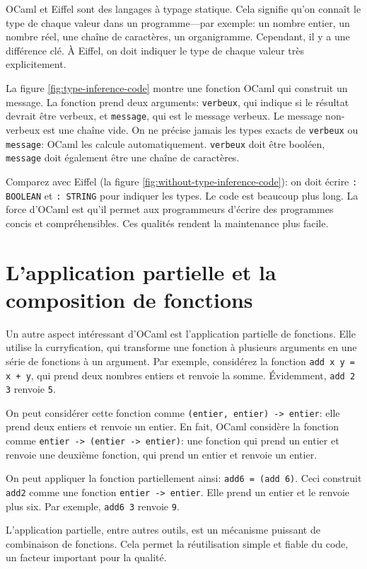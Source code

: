 \documentclass[french]{report}
\begin{document}
OCaml et Eiffel sont des langages à typage statique. Cela signifie qu'on connaît le type de chaque valeur dans un programme---par exemple: un nombre entier, un nombre réel, une chaîne de caractères, un organigramme. Cependant, il y a une différence clé. À Eiffel, on doit indiquer le type de chaque valeur très explicitement.

La figure \ref{fig:type-inference-code} montre une fonction OCaml qui construit un message. La fonction prend deux arguments: \texttt{verbeux}, qui indique si le résultat devrait être verbeux, et \texttt{message}, qui est le message verbeux. Le message non-verbeux est une chaîne vide. On ne précise jamais les types exacts de \texttt{verbeux} ou \texttt{message}: OCaml les calcule automatiquement. \texttt{verbeux} doit être booléen, \texttt{message} doit également être une chaîne de caractères.

Comparez avec Eiffel (la figure \ref{fig:without-type-inference-code}): on doit écrire \texttt{: BOOLEAN} et \texttt{: STRING} pour indiquer les types. Le code est beaucoup plus long. La force d'OCaml est qu'il permet aux programmeurs d'écrire des programmes concis et compréhensibles. Ces qualités rendent la maintenance plus facile.

\section{L'application partielle et la composition de fonctions}

Un autre aspect intéressant d'OCaml est l'application partielle de fonctions. Elle utilise la curryfication, qui transforme une fonction à plusieurs arguments en une série de fonctions à un argument. Par exemple, considérez la fonction \texttt{add x y = x + y}, qui prend deux nombres entiers et renvoie la somme. Évidemment, \texttt{add 2 3} renvoie \texttt{5}.

On peut considérer cette fonction comme \texttt{(entier, entier) -> entier}: elle prend deux entiers et renvoie un entier. En fait, OCaml considère la fonction comme \texttt{entier -> (entier -> entier)}: une fonction qui prend un entier et renvoie une deuxième fonction, qui prend un entier et renvoie un entier. 

On peut appliquer la fonction partiellement ainsi: \texttt{add6 = (add 6)}. Ceci construit \texttt{add2} comme une fonction \texttt{entier -> entier}. Elle prend un entier et le renvoie plus six. Par exemple, \texttt{add6 3} renvoie \texttt{9}.

L'application partielle, entre autres outils, est un mécanisme puissant de combinaison de fonctions. Cela permet la réutilisation simple et fiable du code, un facteur important pour la qualité.
\end{document}
